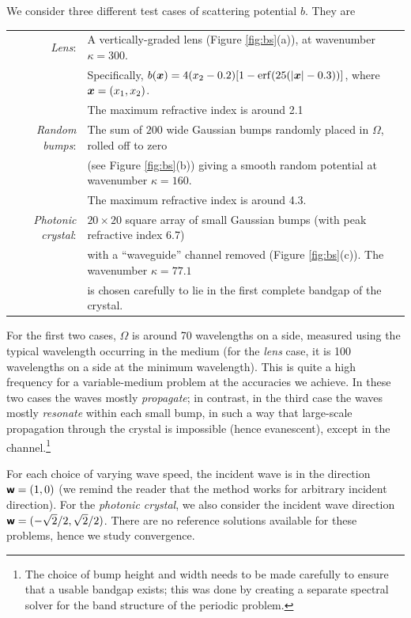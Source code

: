 \documentclass[11pt,final]{amsart}
\theoremstyle{definition}
\numberwithin{remark}{section}
\numberwithin{definition}{section}
\numberwithin{pro}{section}
\begin{document}
We consider three different test cases of scattering potential $b$.  They are

\vspace{.5ex}
\hspace{-5ex}
\begin{tabular}{rl}
 \emph{Lens}: & A vertically-graded lens (Figure \ref{fig:bs}(a)), at wavenumber $\kappa=300$.\\
 & Specifically, $b(\bm{x}) = 4(x_2-0.2)[1-{\rm erf}(25(|\bm{x}|-0.3))]$, where $\bm{x}=(x_1,x_2)$.  \\
& The maximum refractive index is around 2.1\\
\emph{Random bumps}: & The sum of $200$ wide Gaussian bumps randomly placed in $\Omega$,
rolled off to zero\\
&(see Figure \ref{fig:bs}(b))
giving a smooth random potential at wavenumber $\kappa=160$.\\
& The maximum refractive index is around 4.3.
\\
\emph{Photonic crystal}:& $20\times 20$ square array of small Gaussian bumps
(with peak refractive index 6.7) \\
& with a ``waveguide'' channel removed (Figure \ref{fig:bs}(c)).
The wavenumber $\kappa = 77.1$ \\
&is chosen carefully to lie in the first complete bandgap of the crystal.
\end{tabular}
\vspace{.5ex}

For the first two cases, $\Omega$ is around 70 wavelengths on a side, measured using the typical
wavelength occurring in the medium
(for the {\em lens} case, it is 100 wavelengths on a side at the minimum wavelength).
This is quite a high frequency for a variable-medium problem at the accuracies we achieve.
In these two cases the waves mostly {\em propagate}; in contrast, in the third case the waves
mostly {\em resonate} within each small bump,
in such a way that large-scale propagation through the crystal is impossible
(hence evanescent), except in the channel.\footnote{The choice of bump height and width
needs to be made carefully to ensure that a usable bandgap exists;
this was done by creating a separate spectral solver for the band structure of the periodic problem.}

For each choice of varying wave speed, the incident wave is in the direction $\bm{\mathsf{w}}  = (1,0)$
(we remind the reader that the method works for arbitrary incident direction).
For the \emph{photonic crystal}, we also consider the incident wave direction
$\bm{\mathsf{w}} = (-\sqrt{2}/2,\sqrt{2}/2)$.
There are no reference solutions available for these problems, hence we study convergence.
\end{document}
